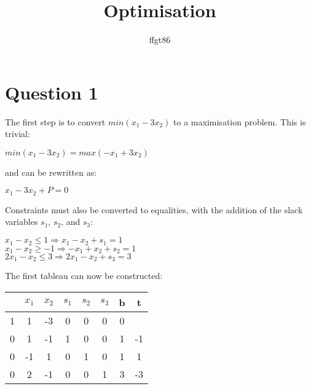 \documentclass[11pt]{article} %
\title{Optimisation}
\author{ffgt86}
\begin{document}
\maketitle

\section*{Question 1}

The first step is to convert $min(x_1 - 3x_2)$ to a maximisation problem. This is trivial:

\begin{center}

$min(x_1 - 3x_2) = max(-x_1 + 3x_2)$

\end{center}

and can be rewritten as:

\begin{center}

$x_1 - 3x_2 + P = 0$

\end{center}

Constraints must also be converted to equalities, with the addition of the slack variables $s_1$, $s_2$, and $s_3$:

\begin{center}

$x_1 - x_2 \leq 1 \Rightarrow x_1 - x_2 + s_1 = 1$ \\
$x_1 - x_2 \geq -1 \Rightarrow -x_1 + x_2 + s_2 = 1$ \\
$2x_1 - x_2 \leq 3 \Rightarrow 2x_1 - x_2 + s_3 = 3$ 

\end{center}

The first tableau can now be constructed:

\begin{center}

\begin{tabular}{ c | c c c c c | c | c }
    & $x_1$ & $x_2$ & $s_1$ & $s_2$ & $s_3$ & b & t \\ \hline
  1 & 1 & -3 & 0 & 0 & 0 & 0 & \\  \hline
  0 & 1 & -1 & 1 & 0 & 0 & 1 & -1\\
  0 & -1 & 1 & 0 & 1 & 0 & 1 & 1\\
  0 & 2 & -1 & 0 & 0 & 1 & 3 & -3\\
\end{tabular}

\end{center}
\end{document}
